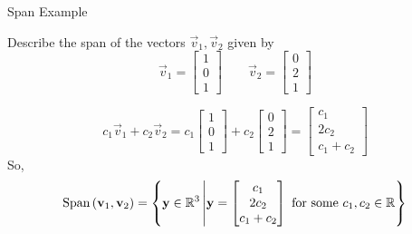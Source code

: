 \documentclass[xcoler=dvipsnames, aspectratio=169]{beamer}
\begin{document}
    \begin{frame}{Span Example}
        \small
        \begin{example}
            Describe the span of the vectors $\vec{v}_1,\vec{v}_2$ given by
            \[
                \vec{v}_1 = \begin{bmatrix}
                    1\\0\\1
                \end{bmatrix}
                \qquad
                \vec{v}_2 = \begin{bmatrix}
                    0\\2\\1
                \end{bmatrix}
            \]
            \pause
            \begin{solution}
                \scriptsize
                \[
                    c_1\vec{v}_1 + c_2\vec{v}_2 = c_1\begin{bmatrix}
                        1\\0\\1
                    \end{bmatrix} + c_2\begin{bmatrix}
                        0\\2\\1
                    \end{bmatrix} = \begin{bmatrix}
                        c_1 \\ 2c_2\\ c_1 + c_2
                    \end{bmatrix}
                \]
                So,
                \[
                    \text{Span}\left(\mathbf{v}_1,\mathbf{v}_2\right) = \left\{\mathbf{y}\in\mathbb{R}^3\left|\mathbf{y} = \begin{bmatrix}
                        c_1\\2c_2\\c_1+c_2
                    \end{bmatrix}\text{ for some }c_1,c_2\in\mathbb{R}\right\}\right.
                \]
            \end{solution}
        \end{example}
    \end{frame}
\end{document}
